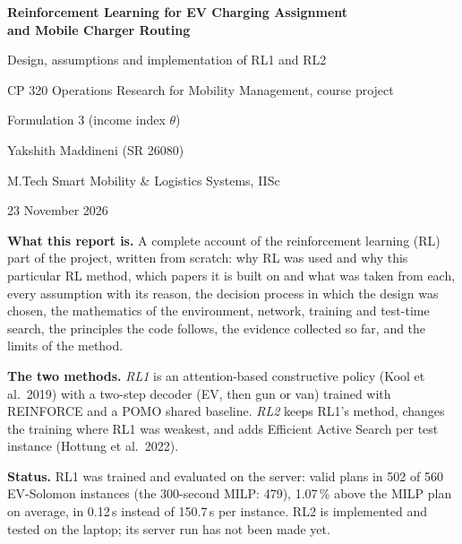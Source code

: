 \documentclass[11pt,a4paper]{article}
\theoremstyle{plain}
\theoremstyle{definition}
\renewcommand{\_}{\origunderscore\allowbreak}
\begin{document}
\begin{titlepage}
\centering
\vspace*{2.5cm}
{\LARGE\bfseries\color{headblue} Reinforcement Learning for EV Charging Assignment\\[4pt] and Mobile Charger Routing\par}
\vspace{10pt}
{\Large Design, assumptions and implementation of RL1 and RL2\par}
\vspace{18pt}
{\large CP 320 Operations Research for Mobility Management, course project\par}
\vspace{4pt}
{\large Formulation 3 (income index $\theta$)\par}
\vspace{30pt}
{\large Yakshith Maddineni (SR 26080)\par}
{\normalsize M.Tech Smart Mobility \& Logistics Systems, IISc\par}
\vspace{8pt}
{\normalsize 23 November 2026\par}
\vfill
\begin{keybox}
\textbf{What this report is.} A complete account of the reinforcement learning (RL) part of the project, written from scratch: why RL was used and why this particular RL method, which papers it is built on and what was taken from each, every assumption with its reason, the decision process in which the design was chosen, the mathematics of the environment, network, training and test-time search, the principles the code follows, the evidence collected so far, and the limits of the method.

\textbf{The two methods.} \emph{RL1} is an attention-based constructive policy (Kool et al.\ 2019) with a two-step decoder (EV, then gun or van) trained with REINFORCE and a POMO shared baseline. \emph{RL2} keeps RL1's method, changes the training where RL1 was weakest, and adds Efficient Active Search per test instance (Hottung et al.\ 2022).

\textbf{Status.} RL1 was trained and evaluated on the server: valid plans in 502 of 560 EV-Solomon instances (the 300-second MILP: 479), 1.07\,\% above the MILP plan on average, in 0.12\,s instead of 150.7\,s per instance. RL2 is implemented and tested on the laptop; its server run has not been made yet.
\end{keybox}
\end{titlepage}
\end{document}
